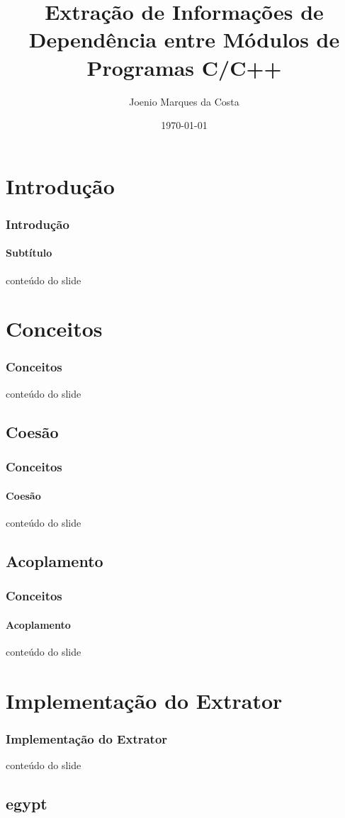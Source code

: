 \documentclass{beamer}
\title[Universidade Católica do Salvador]{Extração de Informações de Dependência entre Módulos de Programas C/C++}
\author[Joenio Costa]{Joenio Marques da Costa}
\institute{UCSal - Universidade Católica do Salvador}
\date{\today}
\begin{document}
\frame{\titlepage} %

\begin{frame}
 \tableofcontents
\end{frame}

\section{Introdução}

\begin{frame}
\frametitle{Introdução}
\framesubtitle{Subtítulo}
 conteúdo do slide
\end{frame}

\section{Conceitos}

\begin{frame}
\frametitle{Conceitos}
 conteúdo do slide
\end{frame}

\subsection{Coesão}

\begin{frame}
\frametitle{Conceitos}
\framesubtitle{Coesão}
 conteúdo do slide
\end{frame}

\subsection{Acoplamento}

\begin{frame}
\frametitle{Conceitos}
\framesubtitle{Acoplamento}
 conteúdo do slide
\end{frame}

\section{Implementação do Extrator}

\begin{frame}
\frametitle{Implementação do Extrator}
 conteúdo do slide
\end{frame}

\subsection{egypt}
\end{document}
